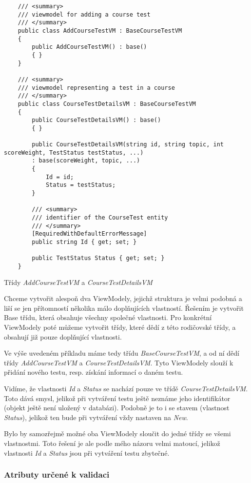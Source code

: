 \begin{program}
	\begin{lstlisting}
	/// <summary>
	/// viewmodel for adding a course test
	/// </summary>
	public class AddCourseTestVM : BaseCourseTestVM
	{
		public AddCourseTestVM() : base()
		{ }
	}
	
	/// <summary>
	/// viewmodel representing a test in a course
	/// </summary>
	public class CourseTestDetailsVM : BaseCourseTestVM
	{
		public CourseTestDetailsVM() : base()
		{ }
		
		public CourseTestDetailsVM(string id, string topic, int scoreWeight, TestStatus testStatus, ...)
		: base(scoreWeight, topic, ...)
		{
			Id = id;
			Status = testStatus;
		}
		
		/// <summary>
		/// identifier of the CourseTest entity
		/// </summary>
		[RequiredWithDefaultErrorMessage]
		public string Id { get; set; }
		
		public TestStatus Status { get; set; }
	}
	\end{lstlisting}
	\caption{Třídy \textit{AddCourseTestVM} a \textit{CourseTestDetailsVM}}
	\label{CourseTestChildVMs}
\end{program}
Chceme vytvořit alespoň dva ViewModely, jejichž struktura je velmi podobná a liší se jen přítomností několika málo doplňujících vlastností. Řešením je vytvořit Base třídu, která obsahuje všechny společné vlastnosti. Pro konkrétní ViewModely poté můžeme vytvořit třídy, které dědí z této rodičovské třídy, a obsahují již pouze doplňující vlastnosti.

Ve výše uvedeném příkladu máme tedy třídu \textit{BaseCourseTestVM}, a od ní dědí třídy \textit{AddCourseTestVM} a \textit{CourseTestDetailsVM}. Tyto ViewModely slouží k přidání nového testu, resp. získání informací o daném testu.

Vidíme, že vlastnosti \textit{Id} a \textit{Status} se nachází pouze ve třídě \textit{CourseTestDetailsVM}. Toto dává smysl, jelikož při vytváření testu ještě neznáme jeho identifikátor (objekt ještě není uložený v databázi).
Podobně je to i se stavem (vlastnost \textit{Status}), jelikož ten bude při vytváření vždy nastaven na \textit{New}.

Bylo by samozřejmě možné oba ViewModely sloučit do jedné třídy se všemi vlastnostmi. Toto řešení je ale podle mého názoru velmi matoucí, jelikož vlastnosti \textit{Id} a \textit{Status} jsou při vytváření testu zbytečné.

\subsubsection*{Atributy určené k validaci}

